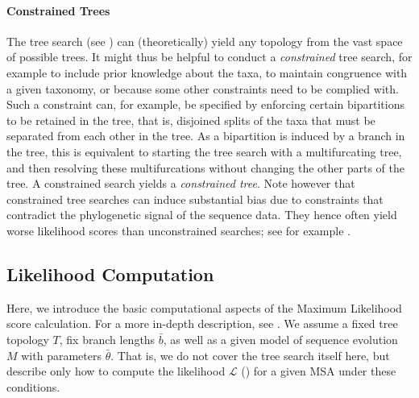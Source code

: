 \paragraph{Constrained Trees}
\label{ch:Foundations:sec:MLTreeInference:sub:FurtherAspects:par:ConstrainedTrees}

The tree search (see )
can (theoretically) yield any topology from the vast space of possible trees.
It might thus be helpful to conduct a \emph{constrained} tree search,
for example to include prior knowledge about the taxa,
to maintain congruence with a given taxonomy, or because some other constraints need to be complied with.
Such a constraint can, for example, be specified by enforcing certain bipartitions to be retained in the tree,
that is, disjoined splits of the taxa that must be separated from each other in the tree.
As a bipartition is induced by a branch in the tree,
this is equivalent to starting the tree search with a multifurcating tree,
and then resolving these multifurcations without changing the other parts of the tree.
A constrained search yields a \emph{constrained tree}.
Note however that constrained tree searches can induce substantial bias
due to constraints that contradict the phylogenetic signal of the sequence data.
They hence often yield worse likelihood scores than unconstrained searches;
see for example .



\subsection{Likelihood Computation}
\label{ch:Foundations:sec:MLTreeInference:sub:LikelihoodComputation}

Here, we introduce the basic computational aspects of the Maximum Likelihood score calculation.
For a more in-depth description, see \cite{Yang2014}.
We assume a fixed tree topology $T$, fix branch lengths $\bar{b}$,
as well as a given model of sequence evolution $M$ with parameters $\bar{\theta}$.
That is, we do not cover the tree search itself here,
but describe only how to compute the likelihood $\mathcal{L}$
() for a given MSA under these conditions.

